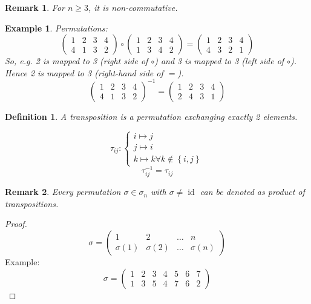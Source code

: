 \documentclass{article}
\newtheorem{example}{Example}  \numberwithin{example}{section}
\newtheorem{definition}{Definition}  \numberwithin{definition}{section}
\newtheorem{remark}{Remark}  \numberwithin{remark}{section}
\newcommand{\set}[1]{\left\{#1\right\}}
\begin{document}
\begin{remark} %
  For $n \geq 3$, it is non-commutative.
\end{remark}

\begin{example} %
  Permutations:
  \[ \begin{pmatrix} 1 & 2 & 3 & 4 \\ 4 & 1 & 3 & 2 \end{pmatrix} \circ \begin{pmatrix} 1 & 2 & 3 & 4 \\ 1 & 3 & 4 & 2 \end{pmatrix} = \begin{pmatrix} 1 & 2 & 3 & 4 \\ 4 & 3 & 2 & 1 \end{pmatrix} \]
  So, e.g. 2 is mapped to 3 (right side of $\circ$) and 3 is mapped to 3 (left side of $\circ$). Hence 2 is mapped to 3 (right-hand side of $=$).
  \[ \begin{pmatrix} 1 & 2 & 3 & 4 \\ 4 & 1 & 3 & 2 \end{pmatrix}^{-1} = \begin{pmatrix} 1 & 2 & 3 & 4 \\ 2 & 4 & 3 & 1 \end{pmatrix} \]
\end{example}

\begin{definition}
  A \emph{transposition} is a permutation exchanging exactly 2 elements.

  \[
    \tau_{ij} : \begin{cases}
      i \mapsto j \\
      j \mapsto i \\
      k \mapsto k \forall k \notin \set{i,j}
    \end{cases}
  \] \[
    \tau_{ij}^{-1} = \tau_{ij}
  \]
\end{definition}

\begin{remark}
  Every permutation $\sigma \in \sigma_n$ with $\sigma \neq \operatorname{id}$ can be denoted as product of transpositions.
\end{remark}

\begin{proof}
  \[ \sigma = \begin{pmatrix} 1 & 2 & \dots & n \\ \sigma(1) & \sigma(2) & \dots & \sigma(n) \end{pmatrix} \]
  Example:
  \[ \sigma = \begin{pmatrix} 1 & 2 & 3 & 4 & 5 & 6 & 7 \\ 1 & 3 & 5 & 4 & 7 & 6 & 2 \end{pmatrix} \]
\end{proof}
\end{document}
